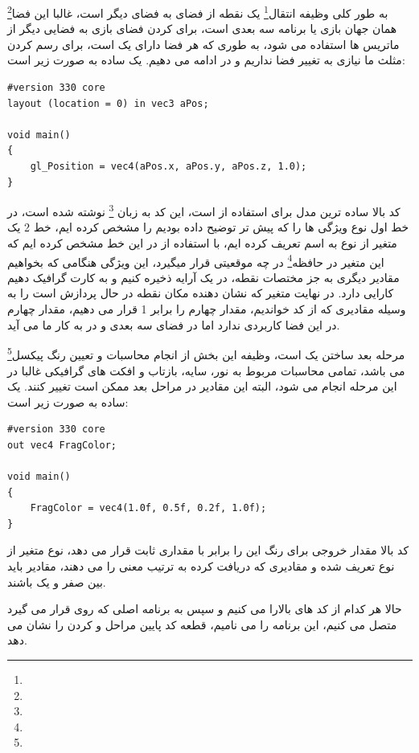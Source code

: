 \documentclass[a4paper, 12pt]{report}
\newcommand{\lrit}[1]{\lr{\textit{#1}}}
\begin{document}
    به طور کلی وظیفه  انتقال\footnote{} یک نقطه از فضای  به فضای دیگر است، غالبا این فضا\footnote{} همان جهان بازی یا برنامه سه بعدی است، برای  کردن فضای بازی به فضایی دیگر از ماتریس ها استفاده می شود، به طوری که هر فضا دارای یک   است، برای رسم کردن مثلث ما نیازی به تغییر فضا نداریم و در  ادامه می دهیم.
    یک  ساده به صورت زیر است:
    \pagebreak
    \begin{LTR}
    \small
        \begin{lstlisting}[style=C++Style,caption=\lrit{basic vertex shader}]
#version 330 core
layout (location = 0) in vec3 aPos;

void main()
{
    gl_Position = vec4(aPos.x, aPos.y, aPos.z, 1.0);
}
        \end{lstlisting}
    \end{LTR}
    \normalsize
    \vspace*{0.3cm}

    کد بالا ساده ترین مدل برای استفاده از  است، این کد به زبان \footnote{} نوشته شده است، در خط اول نوع ویژگی ها را که پیش تر توضیح داده بودیم
    را مشخص کرده ایم، خط 2 یک متغیر از نوع  به اسم  تعریف کرده ایم، با استفاده از \lrit{layout (location = 0)} در این خط مشخص کرده ایم که این متغیر در حافظه\footnote{} در چه موقعیتی قرار میگیرد، این ویژگی هنگامی که بخواهیم مقادیر دیگری به جز مختصات نقطه، در یک آرایه ذخیره کنیم و به کارت گرافیک دهیم کارایی دارد.
    در نهایت متغیر  که نشان دهنده مکان نقطه در حال پردازش است را به وسیله مقادیری که از کد   خواندیم، مقدار چهارم را برابر 1 قرار می دهیم، مقدار چهارم در این فضا کاربردی ندارد اما در فضای سه بعدی و در  به کار ما می آید.\par
    مرحله بعد ساختن یک  است، وظیفه این بخش از  انجام محاسبات و تعیین رنگ پیکسل\footnote{} می باشد، تمامی محاسبات مربوط به نور، سایه، بازتاب و افکت های گرافیکی غالبا در این مرحله انجام می شود، البته این مقادیر در مراحل بعد ممکن است تغییر کنند.
    یک  ساده به صورت زیر است:

    \begin{LTR}
    \small
        \begin{lstlisting}[style=C++Style,caption=\lrit{basic fragment shader}]
#version 330 core
out vec4 FragColor;

void main()
{
    FragColor = vec4(1.0f, 0.5f, 0.2f, 1.0f);
}
        \end{lstlisting}
    \end{LTR}
    \normalsize
    \vspace*{0.3cm}
    کد بالا مقدار خروجی برای رنگ این  را برابر با مقداری ثابت قرار می دهد، نوع متغیر  از نوع  تعریف شده و مقادیری که دریافت کرده به ترتیب معنی  را می دهند، مقادیر باید بین صفر و یک باشند.\par
    حالا هر کدام از کد های بالارا  می کنیم و سپس به برنامه اصلی که روی  قرار می گیرد متصل می کنیم، این برنامه را  می نامیم، قطعه کد پایین مراحل  و  کردن  را نشان می دهد.
\end{document}
